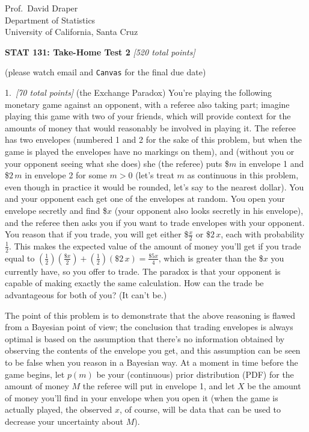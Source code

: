 \documentclass[12pt]{article}
\begin{document}
\begin{flushleft}

Prof.~David Draper \\
Department of Statistics \\
University of California, Santa Cruz

\end{flushleft}

\begin{center}

\textbf{\large STAT 131: Take-Home Test 2} \textit{[520 total points]}

\large

(please watch email and \texttt{Canvas} for the final due date)

\end{center}

1.~\textit{[70 total points]} (the Exchange Paradox) You're playing the
following monetary game against an opponent, with a referee also taking part; imagine playing this game with two of your friends, which will provide context for the amounts of money that would reasonably be involved in playing it. The
referee has two envelopes (numbered 1 and 2 for the sake of this problem,
but when the game is played the envelopes have no markings on them), and
(without you or your opponent seeing what she does) she (the referee) puts \$$m$ in envelope 1 and \$$2 \, m$ in envelope 2 for some $m > 0$ (let's treat $m$ as
continuous in this problem, even though in practice it would be
rounded, let's say to the nearest dollar). You and your opponent each get
one of the envelopes at random. You open your envelope secretly and find
\$$x$ (your opponent also looks secretly in his envelope), and the referee
then asks you if you want to trade envelopes with your opponent. You
reason that if you trade, you will get either \$$\frac{ x }{ 2 }$ or \$$2 \,
x$, each with probability $\frac{ 1 }{ 2 }$. This makes the expected
value of the amount of money you'll get if you trade equal to $\left(
\frac{ 1 }{ 2 } \right) \left( \frac{ \$ x }{ 2 } \right) + \left( \frac{
1 }{ 2 } \right) \left( \$ 2 \, x \right) = \frac{ \$ 5 x }{ 4 }$, which is
greater than the \$$x$ you currently have, so you offer to trade. The
paradox is that your opponent is capable of making exactly the same
calculation. How can the trade be advantageous for both of you? (It can't be.)

The point of this problem is to demonstrate that the above reasoning is
flawed from a Bayesian point of view; the conclusion that trading
envelopes is always optimal is based on the assumption that there's no
information obtained by observing the contents of the envelope you get,
and this assumption can be seen to be false when you reason in a Bayesian
way. At a moment in time before the game begins, let $p ( m )$ be your
(continuous) prior distribution (PDF) for the amount of money $M$ the referee will put in envelope 1, and let $X$ be the amount of money you'll find in your
envelope when you open it (when the game is actually played, the observed
$x$, of course, will be data that can be used to decrease your uncertainty
about $M$). 
\end{document}

